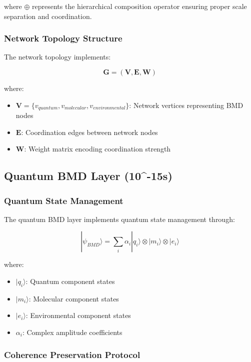 where $\oplus$ represents the hierarchical composition operator ensuring proper scale separation and coordination.

\subsubsection{Network Topology Structure}

The network topology implements:

\begin{equation}
\mathbf{G} = (\mathbf{V}, \mathbf{E}, \mathbf{W})
\end{equation}

where:
\begin{itemize}
\item $\mathbf{V} = \{v_{quantum}, v_{molecular}, v_{environmental}\}$: Network vertices representing BMD nodes
\item $\mathbf{E}$: Coordination edges between network nodes
\item $\mathbf{W}$: Weight matrix encoding coordination strength
\end{itemize}

\subsection{Quantum BMD Layer (10^{-15}s)}

\subsubsection{Quantum State Management}

The quantum BMD layer implements quantum state management through:

\begin{equation}
|\psi_{BMD}\rangle = \sum_{i} \alpha_i |q_i\rangle \otimes |m_i\rangle \otimes |e_i\rangle
\end{equation}

where:
\begin{itemize}
\item $|q_i\rangle$: Quantum component states
\item $|m_i\rangle$: Molecular component states  
\item $|e_i\rangle$: Environmental component states
\item $\alpha_i$: Complex amplitude coefficients
\end{itemize}

\subsubsection{Coherence Preservation Protocol}

